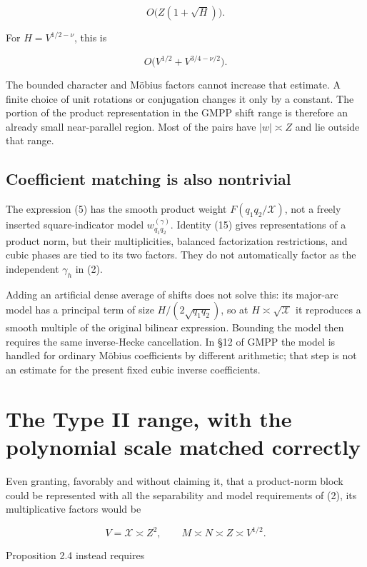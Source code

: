 \[
O\bigl(Z(1+\sqrt H)\bigr).
\tag{16}
\]

For \(H=V^{1/2-\nu}\), this is

\[
O\bigl(V^{1/2}+V^{3/4-\nu/2}\bigr).
\tag{17}
\]

The bounded character and Möbius factors cannot increase that estimate.
A finite choice of unit rotations or conjugation changes it only by a
constant. The portion of the product representation in the GMPP shift
range is therefore an already small near-parallel region. Most of the
pairs have \(|w|\asymp Z\) and lie outside that range.

\subsection{Coefficient matching is also
nontrivial}\label{coefficient-matching-is-also-nontrivial}

The expression (5) has the smooth product weight
\(F(q_1q_2/\mathcal X)\), not a freely inserted square-indicator model
\(w^{(\gamma)}_{q_1q_2}\). Identity (15) gives representations of a
product norm, but their multiplicities, balanced factorization
restrictions, and cubic phases are tied to its two factors. They do not
automatically factor as the independent \(\gamma_h\) in (2).

Adding an artificial dense average of shifts does not solve this: its
major-arc model has a principal term of size \(H/(2\sqrt{q_1q_2})\), so
at \(H\asymp\sqrt{\mathcal X}\) it reproduces a smooth multiple of the
original bilinear expression. Bounding the model then requires the same
inverse-Hecke cancellation. In §12 of GMPP the model is handled for
ordinary Möbius coefficients by different arithmetic; that step is not
an estimate for the present fixed cubic inverse coefficients.

\section{The Type II range, with the polynomial scale matched
correctly}\label{the-type-ii-range-with-the-polynomial-scale-matched-correctly}

Even granting, favorably and without claiming it, that a product-norm
block could be represented with all the separability and model
requirements of (2), its multiplicative factors would be

\[
V=\mathcal X\asymp Z^2,\qquad M\asymp N\asymp Z\asymp V^{1/2}.
\tag{18}
\]

Proposition 2.4 instead requires

